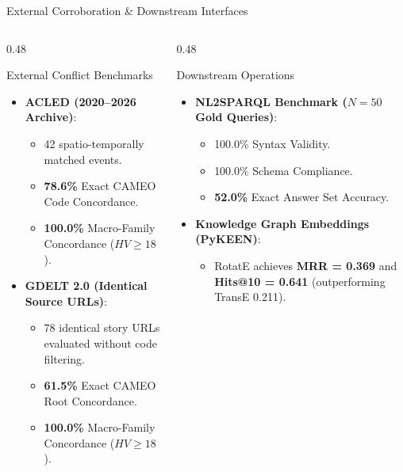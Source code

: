 \documentclass[aspectratio=169, 10pt]{beamer}
\begin{document}
\begin{frame}{External Corroboration \& Downstream Interfaces}
  \begin{columns}[T]
    \begin{column}{0.48\textwidth}
      \begin{block}{External Conflict Benchmarks}
        \small
        \begin{itemize}
          \item \textbf{ACLED (2020--2026 Archive)}:
            \begin{itemize}
              \item 42 spatio-temporally matched events.
              \item \textbf{78.6\%} Exact CAMEO Code Concordance.
              \item \textbf{100.0\%} Macro-Family Concordance ($HV \ge 18$).
            \end{itemize}
          \item \textbf{GDELT 2.0 (Identical Source URLs)}:
            \begin{itemize}
              \item 78 identical story URLs evaluated without code filtering.
              \item \textbf{61.5\%} Exact CAMEO Root Concordance.
              \item \textbf{100.0\%} Macro-Family Concordance ($HV \ge 18$).
            \end{itemize}
        \end{itemize}
      \end{block}
    \end{column}
    \begin{column}{0.48\textwidth}
      \begin{block}{Downstream Operations}
        \small
        \begin{itemize}
          \item \textbf{NL2SPARQL Benchmark ($N=50$ Gold Queries)}:
            \begin{itemize}
              \item 100.0\% Syntax Validity.
              \item 100.0\% Schema Compliance.
              \item \textbf{52.0\%} Exact Answer Set Accuracy.
            \end{itemize}
          \item \textbf{Knowledge Graph Embeddings (PyKEEN)}:
            \begin{itemize}
              \item RotatE achieves \textbf{MRR = 0.369} and \textbf{Hits@10 = 0.641} (outperforming TransE 0.211).
            \end{itemize}
        \end{itemize}
      \end{block}
    \end{column}
  \end{columns}
\end{frame}
\end{document}
